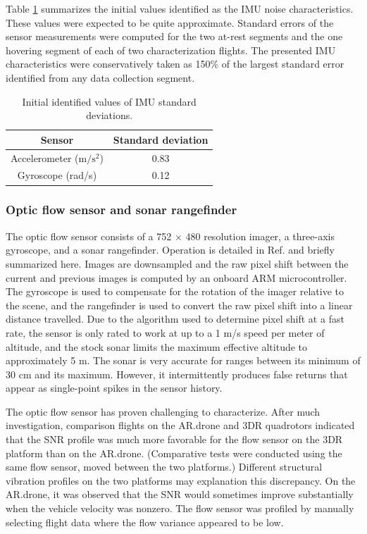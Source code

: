 \documentclass{article}
\begin{document}
Table \ref{tab:imustd} summarizes the initial values identified as the IMU noise characteristics. These values were expected to be quite approximate. Standard errors of the sensor measurements were computed for the two at-rest segments and the one hovering segment of each of two characterization flights. The presented IMU characteristics were conservatively taken as 150\% of the largest standard error identified from any data collection segment.

\begin{table}
\centering
\begin{tabular}{|c|c|}
\hline
Sensor & Standard deviation \\
\hline
Accelerometer ($\mathrm{m/s^2}$) & 0.83 \\
\hline
Gyroscope (rad/s) & 0.12 \\
\hline
\end{tabular}
\caption{Initial identified values of IMU standard deviations.}
\label{tab:imustd}
\end{table}

\subsubsection{Optic flow sensor and sonar rangefinder}

The optic flow sensor consists of a 752 $\times$ 480 resolution imager, a three-axis gyroscope, and a sonar rangefinder. Operation is detailed in Ref. \cite{honegger2013} and briefly summarized here. Images are downsampled and the raw pixel shift between the current and previous images is computed by an onboard ARM microcontroller. The gyroscope is used to compensate for the rotation of the imager relative to the scene, and the rangefinder is used to convert the raw pixel shift into a linear distance travelled. Due to the algorithm used to determine pixel shift at a fast rate, the sensor is only rated to work at up to a 1 m/s speed per meter of altitude, and the stock sonar limits the maximum effective altitude to approximately 5 m. The sonar is very accurate for ranges between its minimum of 30 cm and its maximum. However, it intermittently produces false returns that appear as single-point spikes in the sensor history.

The optic flow sensor has proven challenging to characterize. After much investigation, comparison flights on the AR.drone and 3DR quadrotors indicated that the SNR profile was much more favorable for the flow sensor on the 3DR platform than on the AR.drone. (Comparative tests were conducted using the same flow sensor, moved between the two platforms.) Different structural vibration profiles on the two platforms may explanation this discrepancy. On the AR.drone, it was observed that the SNR would sometimes improve substantially when the vehicle velocity was nonzero. The flow sensor was profiled by manually selecting flight data where the flow variance appeared to be low. 
\end{document}
